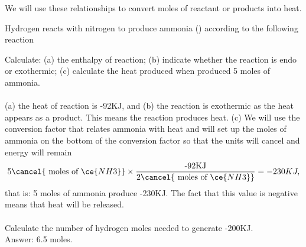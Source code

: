 \documentclass[main.tex]{subfiles}
\begin{document}
\begin{description}
We will use these relationships to convert moles of reactant or products into heat.
  
  \begin{example} %
Hydrogen reacts with nitrogen to produce ammonia () according to the following reaction
\begin{center} \end{center}
Calculate: (a) the enthalpy of reaction; (b) indicate whether the reaction is endo or exothermic; (c) calculate the heat produced when produced 5 moles of ammonia.\\
\\
(a) the heat of reaction is -92KJ, and (b) the reaction is exothermic as the heat appears as a product. This means the reaction produces heat.
(c) We will use the conversion factor that relates ammonia with heat and will set up the moles of ammonia on the bottom of the conversion factor so that the units will cancel and energy will remain
\begin{equation*}
5\cancel{\text{ moles of }\ce{NH3}} \times \dfrac{\text{-92KJ}}{2\cancel{\text{ moles of }\ce{NH3}}}=-230KJ,
\end{equation*}
that is: 5 moles of ammonia produce -230KJ. The fact that this value is negative means that heat will be released.
\\
\faDiamond\ \\
Calculate the number of hydrogen moles needed to generate -200KJ. \\
\flushright Answer: 6.5 moles.
\end{example}%
  
  \clearpage\thispagestyle{empty}\mbox{}


\end{description}
\end{document}
